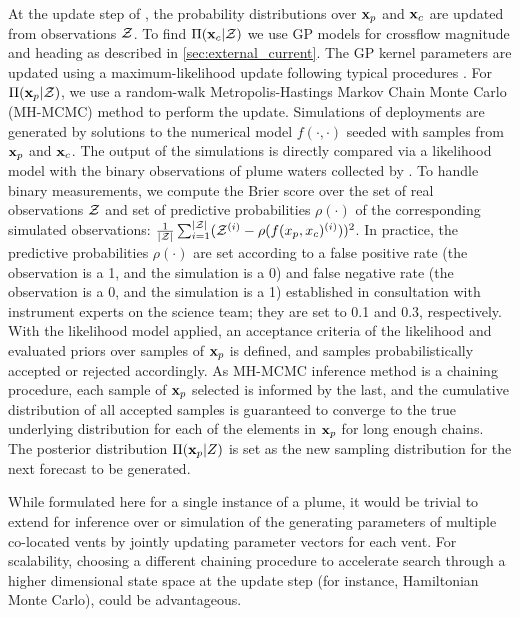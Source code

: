 At the update step of \PHUMES, the probability distributions over $\mathbf{x}_p$ and $\mathbf{x}_c$ are updated from observations $\mathcal{Z}$. To find $\Pi(\mathbf{x}_c|\mathcal{Z})$ we use GP models for crossflow magnitude and heading as described in \cref{sec:external_current}. The GP kernel parameters are updated using a maximum-likelihood update following typical procedures \autocite{Rasmussen2004}. For $\Pi(\mathbf{x}_p | \mathcal{Z})$, we use a random-walk Metropolis-Hastings Markov Chain Monte Carlo (MH-MCMC) method \autocite{metropolis1953equation} to perform the update. Simulations of deployments are generated by solutions to the numerical model $f(\cdot, \cdot)$ seeded with samples from $\mathbf{x}_p$ and $\mathbf{x}_c$. The output of the simulations is directly compared via a likelihood model with the binary observations of plume waters collected by \Sentry. To handle binary measurements, we compute the Brier score \autocite{brier1950verification} over the set of real observations $\mathcal{Z}$ and set of predictive probabilities $\rho(\cdot)$ of the corresponding simulated observations: $\frac{1}{|\mathcal{Z}|}\sum_{i=1}^{|\mathcal{Z}|} (\mathcal{Z}^{(i)} - \rho(f(x_p, x_c)^{(i)}))^2$. In practice, the predictive probabilities $\rho(\cdot)$ are set according to a false positive rate (the observation is a 1, and the simulation is a 0) and false negative rate (the observation is a 0, and the simulation is a 1) established in consultation with instrument experts on the science team; they are set to 0.1 and 0.3, respectively. With the likelihood model applied, an acceptance criteria of the likelihood and evaluated priors over samples of $\mathbf{x}_p$ is defined, and samples probabilistically accepted or rejected accordingly. As MH-MCMC inference method is a chaining procedure, each sample of $\mathbf{x}_p$ selected is informed by the last, and the cumulative distribution of all accepted samples is guaranteed to converge to the true underlying distribution for each of the elements in $\mathbf{x}_p$ for long enough chains. The posterior distribution $\Pi(\mathbf{x}_p | Z)$ is set as the new sampling distribution for the next forecast to be generated.

While formulated here for a single instance of a plume, it would be trivial to extend \PHUMES for inference over or simulation of the generating parameters of multiple co-located vents by jointly updating parameter vectors for each vent. For scalability, choosing a different chaining procedure to accelerate search through a higher dimensional state space at the update step (for instance, Hamiltonian Monte Carlo\autocite{duane1987hybrid}), could be advantageous.


